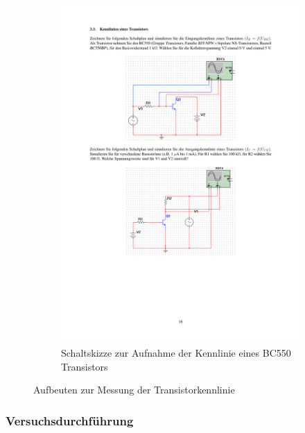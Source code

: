\documentclass[12pt,a4paper]{article}
\begin{document}
\begin{figure}[H]
\begin{subfigure}[b]{0.48\textwidth}
                \includegraphics[trim = 30mm 75mm 30mm 140mm, clip, scale = 0.7]{ep5_14[Page16].pdf}
  				\caption[Schaltskizze zur Aufnahme der Kennlinie eines BC550 Transistors]{Schaltskizze zur Aufnahme der Kennlinie eines BC550 Transistors\footnotemark}
  				\label{fig:1}
        \end{subfigure}
        \caption{Aufbeuten zur Messung der Transistorkennlinie}
        \label{fig:1}
\end{figure}


\subsubsection{Versuchsdurchführung}
\end{document}
